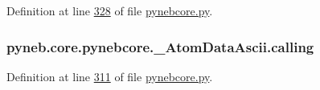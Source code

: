 Definition at line \hyperlink{pynebcore_8py_source_l00328}{328} of file \hyperlink{pynebcore_8py_source}{pynebcore.\+py}.

\hypertarget{classpyneb_1_1core_1_1pynebcore_1_1___atom_data_ascii_af5c364ae799620ff1af6870cf78ae19b}{}
\subsubsection[{calling}]{\setlength{\rightskip}{0pt plus 5cm}pyneb.\+core.\+pynebcore.\+\_\+\+Atom\+Data\+Ascii.\+calling}\label{classpyneb_1_1core_1_1pynebcore_1_1___atom_data_ascii_af5c364ae799620ff1af6870cf78ae19b}


Definition at line \hyperlink{pynebcore_8py_source_l00311}{311} of file \hyperlink{pynebcore_8py_source}{pynebcore.\+py}.




